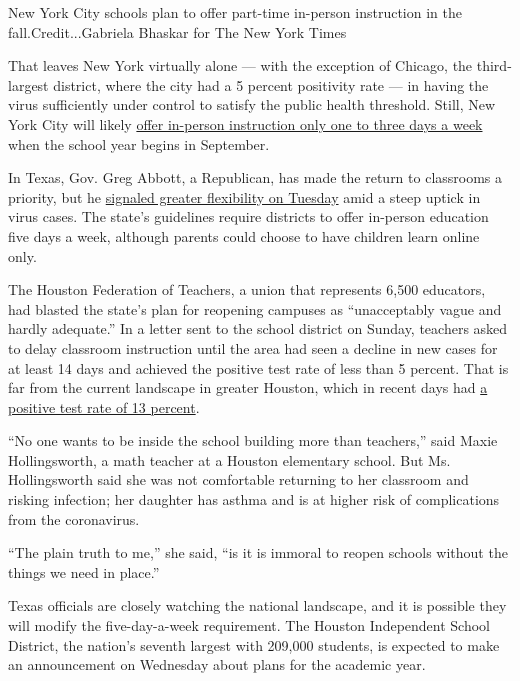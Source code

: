 New York City schools plan to offer part-time in-person instruction in
the fall.Credit...Gabriela Bhaskar for The New York Times

That leaves New York virtually alone --- with the exception of Chicago,
the third-largest district, where the city had a 5 percent positivity
rate --- in having the virus sufficiently under control to satisfy the
public health threshold. Still, New York City will likely
\href{https://www.nytimes3xbfgragh.onion/2020/07/08/nyregion/nyc-schools-reopening-plan.html}{offer
in-person instruction only one to three days a week} when the school
year begins in September.

In Texas, Gov. Greg Abbott, a Republican, has made the return to
classrooms a priority, but he
\href{https://www.texastribune.org/2020/07/14/texas-schools-online-pandemic/}{signaled
greater flexibility on Tuesday} amid a steep uptick in virus cases. The
state's guidelines require districts to offer in-person education five
days a week, although parents could choose to have children learn online
only.

The Houston Federation of Teachers, a union that represents 6,500
educators, had blasted the state's plan for reopening campuses as
``unacceptably vague and hardly adequate.'' In a letter sent to the
school district on Sunday, teachers asked to delay classroom instruction
until the area had seen a decline in new cases for at least 14 days and
achieved the positive test rate of less than 5 percent. That is far from
the current landscape in greater Houston, which in recent days had
\href{https://www.tmc.edu/coronavirus-updates/covid-19-testing-trends/}{a
positive test rate of 13 percent}.

``No one wants to be inside the school building more than teachers,''
said Maxie Hollingsworth, a math teacher at a Houston elementary school.
But Ms. Hollingsworth said she was not comfortable returning to her
classroom and risking infection; her daughter has asthma and is at
higher risk of complications from the coronavirus.

``The plain truth to me,'' she said, ``is it is immoral to reopen
schools without the things we need in place.''

Texas officials are closely watching the national landscape, and it is
possible they will modify the five-day-a-week requirement. The Houston
Independent School District, the nation's seventh largest with 209,000
students, is expected to make an announcement on Wednesday about plans
for the academic year.

